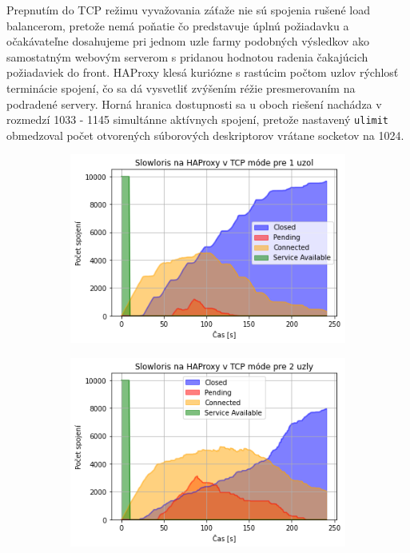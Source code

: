 \documentclass[12pt, a4paper]{article}
\begin{document}
Prepnutím do TCP režimu vyvažovania záťaže nie sú spojenia rušené load balancerom, pretože nemá
poňatie čo predstavuje úplnú požiadavku a očakávateľne dosahujeme pri jednom uzle farmy podobných
výsledkov ako samostatným webovým serverom s pridanou hodnotou radenia čakajúcich požiadaviek do front.
HAProxy klesá kuriózne s rastúcim počtom uzlov rýchlosť terminácie spojení, čo sa dá vysvetliť zvýšením
réžie presmerovaním na podradené servery. Horná hranica dostupnosti sa u oboch riešení nachádza v rozmedzí
1033 - 1145 simultánne aktívnych spojení, pretože nastavený \verb|ulimit| obmedzoval počet otvorených 
súborových deskriptorov vrátane socketov na 1024.

\begin{figure}[h]
	\centering
	\begin{subfigure}[t]{.32\textwidth}
  		\centering
  		\includegraphics[width=\textwidth]{images/haproxy-1-tcp.png}
	\end{subfigure}
	\begin{subfigure}[t]{.32\textwidth}
  		\centering
  		\includegraphics[width=\textwidth]{images/haproxy-2-tcp.png}

\end{subfigure}
\end{figure}
\end{document}
